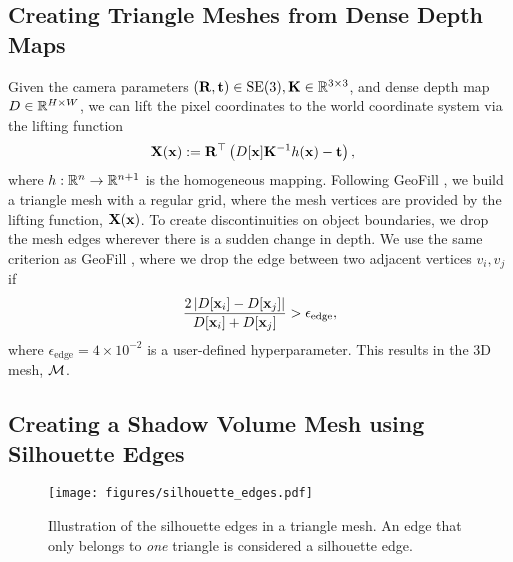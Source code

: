 \subsection{Creating Triangle Meshes from Dense Depth Maps}
\label{supp:subsec:mesh}

Given the camera parameters $(\mathbf{R}, \mathbf{t}) \in \operatorname{SE}(3), \mathbf{K} \in \mathbb{R}^{3\times 3}$, and dense depth map $D \in \mathbb{R}^{H\times W}$, we can lift the pixel coordinates to the world coordinate system via the lifting function
\begin{align}
\mathbf{X}(\mathbf{x}) &:= \mathbf{R}^\top \left(
    D[\mathbf{x}] \mathbf{K}^{-1} h(\mathbf{x}) - \mathbf{t}
\right),
\end{align}
where $h: \mathbb{R}^n \to \mathbb{R}^{n + 1}$ is the homogeneous mapping. Following GeoFill \cite{zhao2023geofill}, we build a triangle mesh with a regular grid, where the mesh vertices are provided by the lifting function, $\mathbf{X}(\mathbf{x})$. To create discontinuities on object boundaries, we drop the mesh edges wherever there is a sudden change in depth. We use the same criterion as GeoFill \cite{zhao2023geofill}, where we drop the edge between two adjacent vertices $v_i, v_j$ if
\begin{align}
\frac{
    2 \left|
        D[\mathbf{x}_i] - D[\mathbf{x}_j]
    \right|
}{
    D[\mathbf{x}_i] + D[\mathbf{x}_j]
} > \epsilon_\text{edge},
\label{eq:depth-criterion}
\end{align}
where $\epsilon_\text{edge} = 4 \times 10^{-2}$ is a user-defined hyperparameter. This results in the 3D mesh, $\mathcal{M}$.

\subsection{Creating a Shadow Volume Mesh using Silhouette Edges}
\label{supp:subsec:shadow}

\begin{figure}[t]
    \centering
    \texttt{[image: figures/silhouette\_edges.pdf]}
    \caption{Illustration of the silhouette edges in a triangle mesh. An edge that only belongs to \emph{one} triangle is considered a silhouette edge.}
    \label{fig:silhouete-edges}
\end{figure}


